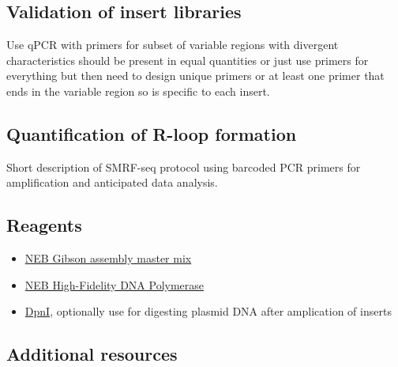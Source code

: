 \documentclass[11pt]{article}
\begin{document}
\subsection{Validation of insert libraries}

Use qPCR with primers for subset of variable regions with divergent characteristics should be present in equal quantities or just use primers for everything but then need to design unique primers or at least one primer that ends in the variable region so is specific to each insert. 

\subsection{Quantification of R-loop formation }

Short description of SMRF-seq protocol using barcoded PCR primers for amplification 
and anticipated data analysis. 

\subsection{Reagents}

\begin{itemize}
	\item \href{https://www.neb.com/products/e2611-gibson-assembly-master-mix#Product\%20Information_Properties\%20\&\%20Usage}{NEB Gibson assembly master mix}
	\item \href{https://www.neb.com/products/m0491-q5-high-fidelity-dna-polymerase#Product\%20Information}{NEB High-Fidelity DNA Polymerase}
	\item \href{https://www.neb.com/products/r0176-dpni?__cf_chl_jschl_tk__=d22d8cb49b9b2d4ff2532de61875fea36af4066f-1626291600-0-ARBMmni5PdhcCrqckk9zN05YGR50cB-otICbDTrUStRYlPQzdrbyJvjEOoI2QusMU-HOcKBcontIQfQRYoQqN9R2hNCL0XzFa2hP3-_c6Vf1sL2Sb2Bs_DXW38t8Oc1NxSg0caQ4FlAGqVNswAJaml9BhLC5dWj1sCuqKwDj72JKO8eI9d3mlCcNVIAVs8n1xFpuo1_oyafffkTnQ-ysv358pg1RrIbChfkwqXctDQennQm_CRjVjuitrXFFNjgAqBDJBKFRMZKkoOYlTDEDBsuaQaQtMxNwL5u7yIJ5mNCrkkuiikIGg7Was3tNj1d7D-7bnJrfXr8jIfG3qW6kvIkrZBJey0JQAVMQGVc4Ps0t0_iS3P4ahcZRytZezR6Fq9lrMqGJkB_Xmxyr0cVoXrbIv136yLISC-RPNR4MDWXe#Product\%20Information}{DpnI}, optionally use for digesting plasmid DNA after amplication of inserts
\end{itemize}

\subsection{Additional resources}
\end{document}
